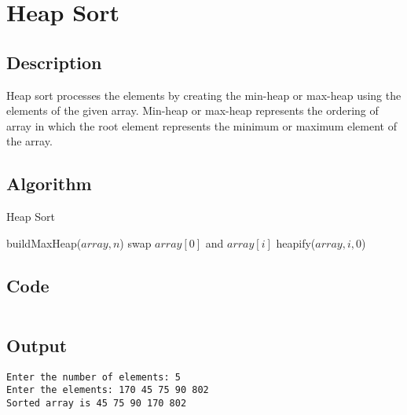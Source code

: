 \section{Heap Sort}

\subsection{Description}
Heap sort processes the elements by creating the min-heap or max-heap using the elements of the given array. Min-heap or max-heap represents the ordering of array in which the root element represents the minimum or maximum element of the array.

\subsection{Algorithm}

%

\begin{algorithm}[H]
    \caption{Heap Sort}
    \begin{algorithmic}[1]
        \State buildMaxHeap($array, n$)
        \State swap $array[0]$ and $array[i]$
        \State heapify($array, i, 0$)
        \EndFor
        \EndProcedure
    \end{algorithmic}
\end{algorithm}

\subsection{Code}

\inputminted[fontsize=\footnotesize,bgcolor=bg,linenos,autogobble,frame=single,framerule=0.01pt,rulecolor=FSBorder,stripall,breaklines]{c++}{code/heap.cpp}

\subsection{Output}

\begin{lstlisting}[style=output]
Enter the number of elements: 5
Enter the elements: 170 45 75 90 802
Sorted array is 45 75 90 170 802
\end{lstlisting}
